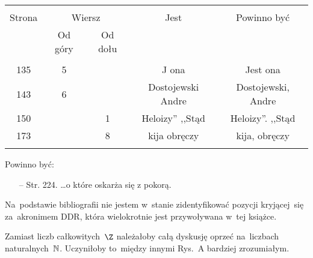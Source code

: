 \documentclass[a4paper,11pt]{article}
\begin{document}
\begin{center}
  \begin{tabular}{|c|c|c|c|c|}
    \hline
    & \multicolumn{2}{c|}{} & & \\
    Strona & \multicolumn{2}{c|}{Wiersz}& Jest & Powinno być \\ \cline{2-3}
    & Od góry & Od dołu &  &  \\ \hline
    & & & & \\
    135 & 5 & & J ona & Jest ona \\
    143 & 6 & & Dostojewski Andre & Dostojewski, Andre \\
    150 & & 1 & Heloizy'' ,,Stąd %
           & Heloizy''. ,,Stąd \\ %
    173 & & 8 & kija obręczy & kija, obręczy \\
    & & & & \\ \hline
  \end{tabular}
\end{center}

Powinno być:
\begin{itemize}
\item[--] Str. 224. \ldots o które oskarża się z pokorą.
\end{itemize}





\newpage
{}

\vspace{\spaceThree}




\start {} Na~podstawie bibliografii nie jestem w~stanie
zidentyfikować pozycji kryjącej~się za~akronimem DDR, która
wielokrotnie jest przywoływana w~tej książce.

\vspace{\spaceFour}


\start {}

\vspace{\spaceFour}


\start {} Zamiast liczb całkowitych~$\Z$ należałoby całą
dyskusję oprzeć na~liczbach naturalnych~$\mathbb{N}$. Uczyniłoby to~między
innymi Rys.~A bardziej zrozumiałym.
\end{document}
